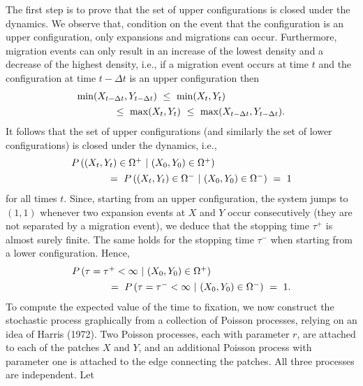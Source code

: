 \indent The first step is to prove that the set of upper configurations is closed under the dynamics.
 We observe that, condition on the event that the configuration is an upper configuration, only expansions and
 migrations can occur.
 Furthermore, migration events can only result in an increase of the lowest density and a decrease of the highest density,
 i.e., if a migration event occurs at time $t$ and the configuration at time $t - \Delta t$ is an upper configuration then
 $$ \begin{array}{l}
    \min (X_{t - \Delta t}, Y_{t - \Delta t}) \ \leq \ \min (X_t, Y_t) \vspace{4pt} \\ \hspace{40pt} \leq \
    \max (X_t, Y_t) \ \leq \ \max (X_{t - \Delta t}, Y_{t - \Delta t}). \end{array} $$
 It follows that the set of upper configurations (and similarly the set of lower configurations) is closed under the
 dynamics, i.e.,
 $$ \begin{array}{l}
  P \,((X_t, Y_t) \in \Omega^+ \ | \ (X_0, Y_0) \in \Omega^+) \vspace{4pt} \\ \hspace{40pt} = \
  P \,((X_t, Y_t) \in \Omega^- \ | \ (X_0, Y_0) \in \Omega^-) \ = \ 1 \end{array} $$
 for all times $t$.
 Since, starting from an upper configuration, the system jumps to $(1, 1)$ whenever two
 expansion events at $X$ and $Y$ occur consecutively (they are not separated by a migration event), we deduce that
 the stopping time $\tau^+$ is almost surely finite.
 The same holds for the stopping time $\tau^-$ when starting from a lower configuration. Hence,
 $$ \begin{array}{l}
  P \,(\tau = \tau^+ < \infty \ | \ (X_0, Y_0) \in \Omega^+) \vspace{4pt} \\ \hspace{40pt} = \
  P \,(\tau = \tau^- < \infty \ | \ (X_0, Y_0) \in \Omega^-) \ = \ 1. \end{array} $$
 To compute the expected value of the time to fixation, we now construct the stochastic process graphically from a collection
 of Poisson processes, relying on an idea of Harris (1972).
 Two Poisson processes, each with parameter $r$, are attached to each of the patches $X$ and $Y$, and an additional Poisson
 process with parameter one is attached to the edge connecting the patches.
 All three processes are independent. Let
